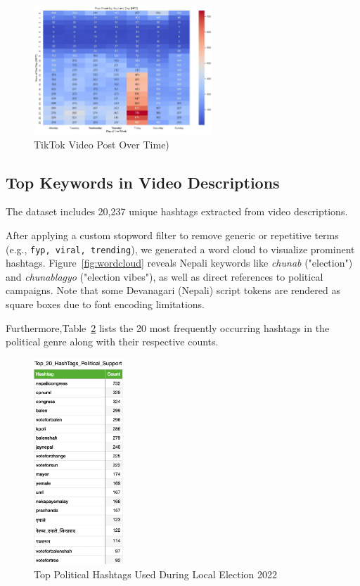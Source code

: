 \documentclass[12pt,a4paper]{report}
\begin{document}
\begin{figure}[htbp]
    \centering
    \includegraphics[width=0.60\textwidth]{figures/EDA/heatmap_post_count.jpg}
    \caption{TikTok Video Post Over Time)}
    \label{fig:tiktok_heatmap_postcount}
\end{figure}


\subsection{Top Keywords in Video Descriptions}

The dataset includes 20,237 unique hashtags extracted from video descriptions. 

After applying a custom stopword filter to remove generic or repetitive terms (e.g., \texttt{fyp, viral, trending}), we generated a word cloud to visualize prominent hashtags. Figure~\ref{fig:wordcloud} reveals Nepali keywords like \textit{chunab} ("election") and \textit{chunablagyo} ("election vibes"), as well as direct references to political campaigns. Note that some Devanagari (Nepali) script tokens are rendered as square boxes due to font encoding limitations.

Furthermore,Table~\ref{fig:top_political_hashtag} lists the 20 most frequently occurring hashtags in the political genre along with their respective counts.

\begin{figure}[htbp]
    \centering
    \includegraphics[width=0.30\textwidth]{figures/EDA/Top_20_Political_Hashtag.png}
    \caption{Top Political Hashtags Used During Local Election 2022}
    \label{fig:top_political_hashtag}
\end{figure}
\end{document}
